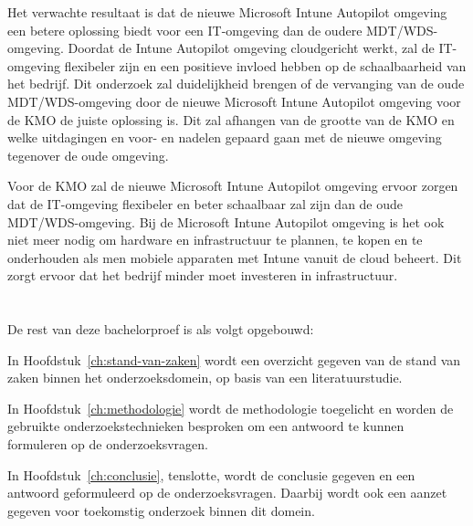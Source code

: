 Het verwachte resultaat is dat de nieuwe Microsoft Intune Autopilot omgeving een betere oplossing biedt voor een IT-omgeving dan de oudere MDT/WDS-omgeving. Doordat de Intune Autopilot omgeving cloudgericht werkt, zal de IT-omgeving flexibeler zijn en een positieve invloed hebben op de schaalbaarheid van het bedrijf. Dit onderzoek zal duidelijkheid brengen of de vervanging van de oude MDT/WDS-omgeving door de nieuwe Microsoft Intune Autopilot omgeving voor de KMO de juiste oplossing is. Dit zal afhangen van de grootte van de KMO en welke uitdagingen en voor- en nadelen gepaard gaan met de nieuwe omgeving tegenover de oude omgeving.

Voor de KMO zal de nieuwe Microsoft Intune Autopilot omgeving ervoor zorgen dat de IT-omgeving flexibeler en beter schaalbaar zal zijn dan de oude MDT/WDS-omgeving. Bij de Microsoft Intune Autopilot omgeving is het ook niet meer nodig om hardware en infrastructuur te plannen, te kopen en te onderhouden als men mobiele apparaten met Intune vanuit de cloud beheert. Dit zorgt ervoor dat het bedrijf minder moet investeren in infrastructuur.


\section{}
\label{sec:opzet-bachelorproef}


De rest van deze bachelorproef is als volgt opgebouwd:

In Hoofdstuk~\ref{ch:stand-van-zaken} wordt een overzicht gegeven van de stand van zaken binnen het onderzoeksdomein, op basis van een literatuurstudie.

In Hoofdstuk~\ref{ch:methodologie} wordt de methodologie toegelicht en worden de gebruikte onderzoekstechnieken besproken om een antwoord te kunnen formuleren op de onderzoeksvragen.


In Hoofdstuk~\ref{ch:conclusie}, tenslotte, wordt de conclusie gegeven en een antwoord geformuleerd op de onderzoeksvragen. Daarbij wordt ook een aanzet gegeven voor toekomstig onderzoek binnen dit domein.
